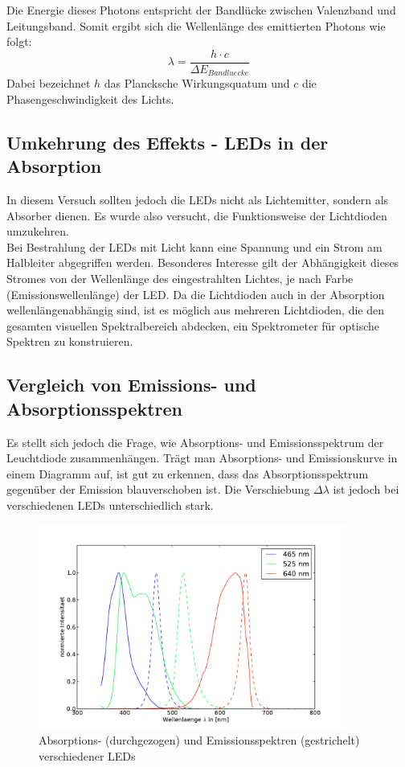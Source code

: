 \documentclass[11pt]{scrartcl}
\begin{document}
Die Energie dieses Photons entspricht der Bandlücke zwischen Valenzband und Leitungsband. Somit ergibt sich die Wellenlänge des emittierten Photons wie folgt:
 \[ \lambda = \frac{h \cdot c}{\Delta E_{Bandluecke}} \]
Dabei bezeichnet $h$ das Plancksche Wirkungsquatum und $c$ die Phasengeschwindigkeit des Lichts.

\subsection{Umkehrung des Effekts - LEDs in der Absorption}
In diesem Versuch sollten jedoch die LEDs nicht als Lichtemitter, sondern als Absorber dienen. Es wurde also versucht, die Funktionsweise der Lichtdioden umzukehren.\\
Bei Bestrahlung der LEDs mit Licht kann eine Spannung und ein Strom am Halbleiter abgegriffen werden. Besonderes Interesse gilt der Abhängigkeit dieses Stromes von der Wellenlänge des eingestrahlten Lichtes, je nach Farbe (Emissionswellenlänge) der LED. Da die Lichtdioden auch in der Absorption wellenlängenabhängig sind, ist es möglich aus mehreren Lichtdioden, die den gesamten visuellen Spektralbereich abdecken, ein Spektrometer für optische Spektren zu konstruieren.

\subsection{Vergleich von Emissions- und Absorptionsspektren}
Es stellt sich jedoch die Frage, wie Absorptions- und Emissionsspektrum der Leuchtdiode zusammenh\"angen.
Tr\"agt man Absorptions- und Emissionskurve in einem Diagramm auf, ist gut zu erkennen, dass das Absorptionsspektrum gegen\"uber der Emission blauverschoben ist. Die Verschiebung $\Delta \lambda$ ist jedoch bei verschiedenen LEDs unterschiedlich stark.

\begin{figure}[ht]
\begin{center}
\includegraphics[width=0.9\textwidth]{images/absorp-emit.pdf}
\end{center}
\vspace{-1.5\baselineskip}
\caption{Absorptions- (durchgezogen) und Emissionsspektren (gestrichelt) verschiedener LEDs}
\label{Absorption und Emission von LEDs}
\end{figure}
\end{document}
